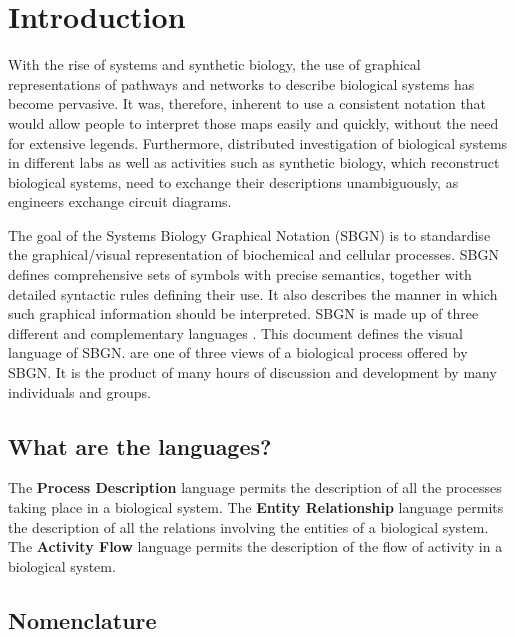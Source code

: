 \chapter{Introduction}

With the rise of systems and synthetic biology, the use of graphical representations
of pathways and networks to describe biological systems has become pervasive. 
It was, therefore, inherent to use a consistent notation that would allow people 
to interpret those maps easily and quickly, without the need for extensive legends.
Furthermore, distributed investigation of biological systems in different labs as well
as activities such as synthetic biology, which reconstruct biological systems, need
to exchange their descriptions unambiguously, as engineers exchange circuit diagrams.

The goal of the Systems Biology Graphical Notation (SBGN) is to standardise the 
graphical/visual representation of biochemical and cellular processes. SBGN 
defines comprehensive sets of symbols with precise semantics, together with 
detailed syntactic rules defining their use. It also describes the manner 
in which such graphical information should be interpreted.
SBGN is made up of three different and complementary languages \cite{Novere:2009p1}.
This document defines the \emph{\PD{}} visual language of SBGN. \PDs are 
one of three views of a biological process offered by SBGN. It is the 
product of many hours of discussion and development by many individuals and 
groups.

\section{What are the languages?}
\label{sec:what-languages}

The \textbf{Process Description} language permits the description of all the processes taking place in a biological system. 
The \textbf{Entity Relationship} language permits the description of all the relations involving the entities of a biological system.
The \textbf{Activity Flow} language permits the description of the flow of activity in a biological system.

\section{Nomenclature}
\label{sec:nomenclature}

